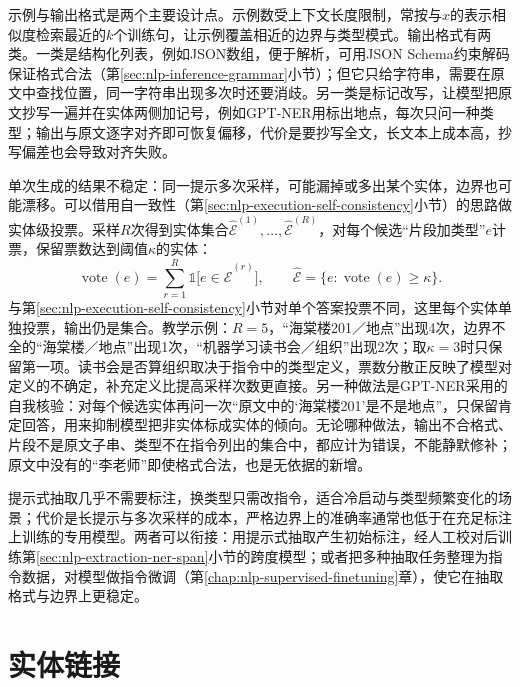 示例与输出格式是两个主要设计点。示例数受上下文长度限制，常按与$x$的表示相似度检索最近的$k$个训练句，让示例覆盖相近的边界与类型模式。输出格式有两类。一类是结构化列表，例如JSON数组，便于解析，可用JSON Schema约束解码保证格式合法（第\ref{sec:nlp-inference-grammar}小节）；但它只给字符串，需要在原文中查找位置，同一字符串出现多次时还要消歧。另一类是标记改写，让模型把原文抄写一遍并在实体两侧加记号，例如GPT-NER用标出地点，每次只问一种类型；输出与原文逐字对齐即可恢复偏移，代价是要抄写全文，长文本上成本高，抄写偏差也会导致对齐失败。

单次生成的结果不稳定：同一提示多次采样，可能漏掉或多出某个实体，边界也可能漂移。可以借用自一致性（第\ref{sec:nlp-execution-self-consistency}小节）的思路做实体级投票。采样$R$次得到实体集合$\hat{\mathcal E}^{(1)},\ldots,\hat{\mathcal E}^{(R)}$，对每个候选“片段加类型”$e$计票，保留票数达到阈值$\kappa$的实体：
\begin{equation}
  \operatorname{vote}(e)=\sum_{r=1}^{R}\mathbb 1\bigl[e\in\hat{\mathcal E}^{(r)}\bigr],\qquad
  \hat{\mathcal E}=\{e:\operatorname{vote}(e)\geq\kappa\}.
  \label{eq:nlp-extraction-entity-vote}
\end{equation}
与第\ref{sec:nlp-execution-self-consistency}小节对单个答案投票不同，这里每个实体单独投票，输出仍是集合。教学示例：$R=5$，“海棠楼201／地点”出现4次，边界不全的“海棠楼／地点”出现1次，“机器学习读书会／组织”出现2次；取$\kappa=3$时只保留第一项。读书会是否算组织取决于指令中的类型定义，票数分散正反映了模型对定义的不确定，补充定义比提高采样次数更直接。另一种做法是GPT-NER采用的自我核验：对每个候选实体再问一次“原文中的‘海棠楼201’是不是地点”，只保留肯定回答，用来抑制模型把非实体标成实体的倾向。无论哪种做法，输出不合格式、片段不是原文子串、类型不在指令列出的集合中，都应计为错误，不能静默修补；原文中没有的“李老师”即使格式合法，也是无依据的新增。

提示式抽取几乎不需要标注，换类型只需改指令，适合冷启动与类型频繁变化的场景；代价是长提示与多次采样的成本，严格边界上的准确率通常也低于在充足标注上训练的专用模型。两者可以衔接：用提示式抽取产生初始标注，经人工校对后训练第\ref{sec:nlp-extraction-ner-span}小节的跨度模型；或者把多种抽取任务整理为指令数据，对模型做指令微调（第\ref{chap:nlp-supervised-finetuning}章），使它在抽取格式与边界上更稳定。

\section{实体链接}
\label{sec:nlp-extraction-linking}

